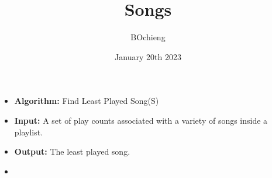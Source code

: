 \documentclass{article}
\title{Songs}
\author{BOchieng}
\date{January 20th 2023}
\begin{document}
\begin{itemize}
\item[]
\textbf{Algorithm:} Find Least Played Song(S)
\item[]
\textbf{Input:} A set of play counts associated with a variety of songs inside a playlist.
\item[]
\textbf{Output:} The least played song.
\item[]
\end{itemize}
\end{document}
